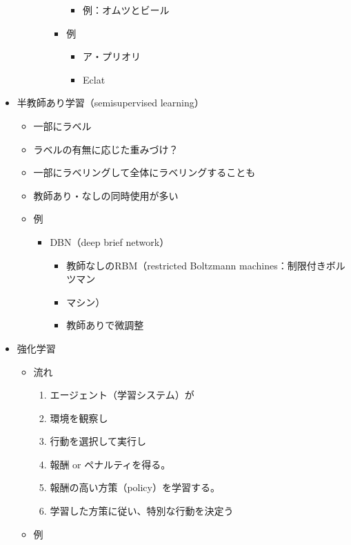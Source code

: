 \begin{itemize}
\begin{itemize}
\begin{itemize}
\begin{itemize}
        \begin{itemize}
        \tightlist
        \item
          例：オムツとビール
        \end{itemize}
      \item
        例

        \begin{itemize}
        \tightlist
        \item
          ア・プリオリ
        \item
          Eclat
        \end{itemize}
      \end{itemize}
    \end{itemize}
  \end{itemize}
\item
  半教師あり学習（semisupervised learning）

  \begin{itemize}
  \tightlist
  \item
    一部にラベル
  \item
    ラベルの有無に応じた重みづけ？
  \item
    一部にラベリングして全体にラベリングすることも
  \item
    教師あり・なしの同時使用が多い
  \item
    例

    \begin{itemize}
    \tightlist
    \item
      DBN（deep brief network）

      \begin{itemize}
      \tightlist
      \item
        教師なしのRBM（restricted Boltzmann machines：制限付きボルツマン
      \item
        マシン）
      \item
        教師ありで微調整
      \end{itemize}
    \end{itemize}
  \end{itemize}
\item
  強化学習

  \begin{itemize}
  \tightlist
  \item
    流れ

    \begin{enumerate}
    \def\labelenumi{\arabic{enumi}.}
    \tightlist
    \item
      エージェント（学習システム）が
    \item
      環境を観察し
    \item
      行動を選択して実行し
    \item
      報酬 or ペナルティを得る。
    \item
      報酬の高い方策（policy）を学習する。
    \item
      学習した方策に従い、特別な行動を決定う
    \end{enumerate}
  \item
    例


\end{itemize}
\end{itemize}
